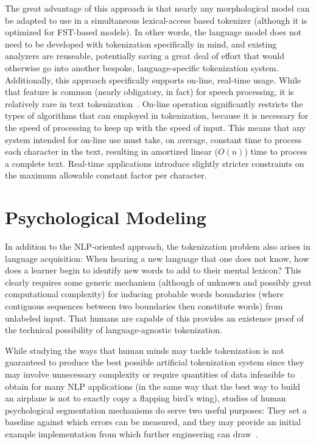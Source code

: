 The great advantage of this approach is that nearly any morphological model can be adapted to use in a simultaneous lexical-access based tokenizer (although it is optimized for FST-based models). In other words, the language model does not need to be developed with tokenization specifically in mind, and existing analyzers are reuseable, potentially saving a great deal of effort that would otherwise go into another bespoke, language-specific tokenization system. Additionally, this approach specifically supports on-line, real-time usage. While that feature is common (nearly obligatory, in fact) for speech processing, it is relatively rare in text tokenization~\cite{aken11}. On-line operation significantly restricts the types of algorithms that can employed in tokenization, because it is necessary for the speed of processing to keep up with the speed of input. This means that any system intended for on-line use must take, on average, constant time to process each character in the text, resulting in amortized linear ($O(n)$) time to process a complete text. Real-time applications introduce slightly stricter constraints on the maximum allowable constant factor per character.

\section{Psychological Modeling}

In addition to the NLP-oriented approach, the tokenization problem also arises in language acquisition: When hearing a new language that one does not know, how does a learner begin to identify new words to add to their mental lexicon? This clearly requires some generic mechanism (although of unknown and possibly great computational complexity) for inducing probable words boundaries (where contiguous sequences between two boundaries then constitute words) from unlabeled input. That humans are capable of this provides an existence proof of the technical possibility of language-agnostic tokenization.

While studying the ways that human minds may tackle tokenization is not guaranteed to produce the best possible artificial tokenization system since they may involve unnecessary complexity or require quantities of data infeasible to obtain for many NLP applications (in the same way that the best way to build an airplane is not to exactly copy a flapping bird's wing), studies of human psychological segmentation mechanisms do serve two useful purposes: They set a baseline against which errors can be measured, and they may provide an initial example implementation from which further engineering can draw~\cite{daland09}.

